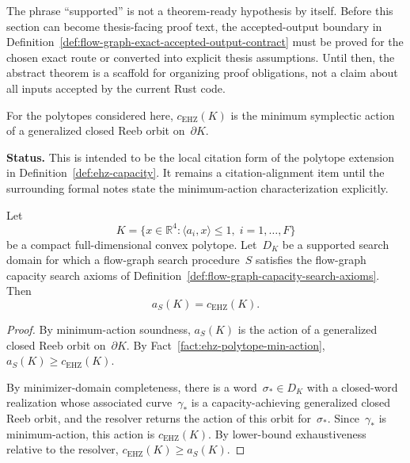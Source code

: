\begin{remark}%
\label{rem:flow-graph-supported-contract-open}
The phrase ``supported'' is not a theorem-ready hypothesis by itself.  Before
this section can become thesis-facing proof text, the accepted-output boundary
in Definition~\ref{def:flow-graph-exact-accepted-output-contract} must be
proved for the chosen exact route or converted into explicit thesis
assumptions.  Until then, the abstract theorem is a scaffold for organizing
proof obligations, not a claim about all inputs accepted by the current Rust
code.
\end{remark}

\begin{unverified}
\begin{fact}%
\label{fact:ehz-polytope-min-action}
For the polytopes considered here,
$c_{\mathrm{EHZ}}(K)$ is the minimum symplectic action of a generalized closed
Reeb orbit on~$\partial K$.

\textbf{Status.}  This is intended to be the local citation form of the
polytope extension in Definition~\ref{def:ehz-capacity}.  It remains a
citation-alignment item until the surrounding formal notes state the
minimum-action characterization explicitly.
\end{fact}
\end{unverified}

\begin{unverified}
\begin{theorem}%
\label{thm:abstract-flow-graph-capacity}
Let
\[
  K = \{x \in \mathbb{R}^4 :
    \langle a_i, x \rangle \leq 1,\; i = 1,\ldots,F\}
\]
be a compact full-dimensional convex polytope.  Let~$D_K$ be a supported search
domain for which a flow-graph search procedure~$S$ satisfies the flow-graph
capacity search axioms of
Definition~\ref{def:flow-graph-capacity-search-axioms}.  Then
\[
  a_S(K) = c_{\mathrm{EHZ}}(K).
\]
\end{theorem}

\begin{proof}
By minimum-action soundness, $a_S(K)$ is the action of a generalized closed
Reeb orbit on~$\partial K$.  By
Fact~\ref{fact:ehz-polytope-min-action},
$a_S(K) \geq c_{\mathrm{EHZ}}(K)$.

By minimizer-domain completeness, there is a word~$\sigma_*\in D_K$ with a
closed-word realization whose associated curve~$\gamma_*$ is a
capacity-achieving generalized closed Reeb orbit, and the resolver returns the
action of this orbit for~$\sigma_*$.  Since~$\gamma_*$ is minimum-action, this
action is $c_{\mathrm{EHZ}}(K)$.  By lower-bound exhaustiveness relative to the
resolver,
$c_{\mathrm{EHZ}}(K) \geq a_S(K)$.
\end{proof}
\end{unverified}

